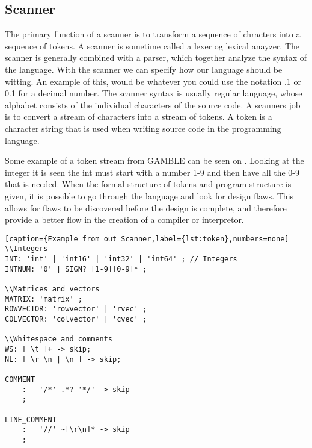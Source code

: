 \subsection{Scanner}
The primary function of a scanner is to transform a sequence of chracters into a sequence of tokens.
A scanner is sometime called a lexer og lexical anayzer.
The scanner is generally combined with a parser, which together analyze the syntax of the language.
With the scanner we can specify how our language should be witting. 
An example of this, would be whatever you could use the notation .1 or 0.1 for a decimal number.
The scanner syntax is usually regular language, whose alphabet consists of the individual characters of the source code.
A scanners job is to convert a stream of characters into a stream of tokens.
A token is a character string that is used when writing source code in the programming language.

Some example of a token stream from GAMBLE can be seen on \myref{}.
Looking at the integer it is seen  the int must start with a number 1-9 and then have all the 0-9 that is needed.
When the formal structure of tokens and program structure is given, it is possible to go through the language and look for design flaws.
This allows for flaws to be discovered before the design is complete, and therefore provide a better flow in the creation of a compiler or interpretor.

\begin{lstlisting}[caption={Example from out Scanner,label={lst:token},numbers=none]
\\Integers
INT: 'int' | 'int16' | 'int32' | 'int64' ; // Integers
INTNUM: '0' | SIGN? [1-9][0-9]* ;

\\Matrices and vectors
MATRIX: 'matrix' ;
ROWVECTOR: 'rowvector' | 'rvec' ;
COLVECTOR: 'colvector' | 'cvec' ;  

\\Whitespace and comments
WS: [ \t ]+ -> skip;
NL: [ \r \n | \n ] -> skip;

COMMENT
    :   '/*' .*? '*/' -> skip
    ;

LINE_COMMENT
    :   '//' ~[\r\n]* -> skip
    ;
\end{lstlisting}